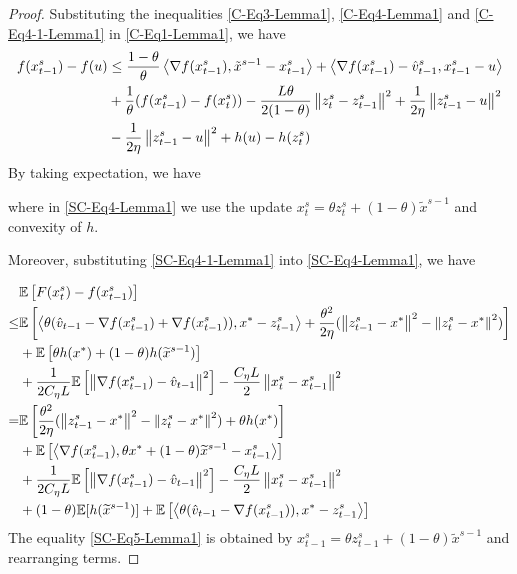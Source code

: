 \documentclass{article}
\newcommand*{\E}{\mathbb{E}}
\newcommand{\norm}[1]{\left\lVert#1\right\rVert}
\newcommand{\Iprod}[2]{\left\langle #1,#2\right\rangle}
\theoremstyle{definition}
\theoremstyle{remark}
\begin{document}
{{\begin{proof}
Substituting the inequalities \eqref{C-Eq3-Lemma1}, \eqref{C-Eq4-Lemma1} and \eqref{C-Eq4-1-Lemma1} in \eqref{C-Eq1-Lemma1}, we have
\begin{align}
f(x_{t-1}^s) -f(u)&\leq \frac{1-\theta}{\theta}\Iprod{\nabla f(x_{t-1}^s)}{\tilde{x}^{s-1}-x_{t-1}^s}+\Iprod{\nabla f(x_{t-1}^s) - \hat{v}_{t-1}^s}{x_{t-1}^s-u}\notag\\
&+\frac{1}{\theta}(f(x_{t-1}^s)-f(x_{t}^s))-{\frac{L\theta}{2(1-\theta)}}\norm{z_{t}^s-z_{t-1}^s}^2+{\frac{1}{2\eta}}\norm{z_{t-1}^s-u}^2\\
&-{\frac{1}{2\eta}}\norm{z_{t-1}^s-u}^2+h(u) - h(z_{t}^s)
\label{C-Eq4-Lemma1}
\end{align}
By taking expectation, we have

where in \eqref{SC-Eq4-Lemma1} we use the update $x_t^s = \theta z_t^s+(1-\theta)\widetilde{x}^{s-1}$ and convexity of $h$. 

Moreover, substituting \eqref{SC-Eq4-1-Lemma1} into  \eqref{SC-Eq4-Lemma1}, we have

\begin{align}
&\E\left[F(x_{t}^s) -f(x_{t-1}^s)\right]\notag\\
{\leq}&\E\left[\Iprod{\theta(\hat{v}_{t-1}-\nabla f(x_{t-1}^s)+\nabla f(x_{t-1}^s))}{x^* - z_{t-1}^s}+{\frac{\theta^2}{2\eta}}(\norm{z_{t-1}^s-x^*}^2-\norm{z_{t}^s-x^*}^2)\right]\notag\\
&+\E\left[\theta h(x^*)+(1-\theta) h(\widetilde{x}^{s-1})\right]\notag\\
&+\frac{1}{2C_{\eta} L}\E\left[\norm{\nabla f(x_{t-1}^s)-\hat{v}_{t-1}}^2\right]-\frac{C_{\eta} L}{2}\norm{x_{t}^s-x_{t-1}^s}^2\\
 =& \E\left[{\frac{ \theta^2}{2\eta}}(\norm{z_{t-1}^s-x^*}^2-\norm{z_{t}^s-x^*}^2)+\theta h(x^*)\right]\notag\\
&+\E\left[\Iprod{\nabla f(x_{t-1}^s)}{\theta x^*+(1-\theta)\widetilde{x}^{s-1}-{x}^{s}_{t-1}}\right]\notag\\
&+\frac{1}{2C_{\eta} L}\E\left[\norm{\nabla f(x_{t-1}^s)-\hat{v}_{t-1}}^2\right]-\frac{C_{\eta} L}{2}\norm{x_{t}^s-x_{t-1}^s}^2\notag\\
&+(1-\theta) \E[h(\widetilde{x}^{s-1})]+\E\left[\Iprod{\theta(\hat{v}_{t-1}-\nabla f(x_{t-1}^s))}{x^* - z_{t-1}^s}\right]\label{SC-Eq5-Lemma1}
\raisetag{18pt}
\end{align}
The equality \eqref{SC-Eq5-Lemma1} is obtained by $x_{t-1}^s = \theta z_{t-1}^s+(1-\theta)\widetilde{x}^{s-1}$ and rearranging terms. 


\end{proof}}}
\end{document}
